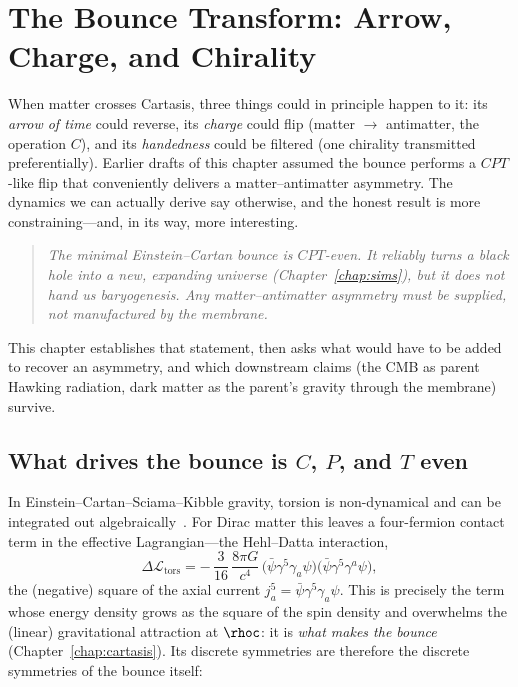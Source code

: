 \chapter{The Bounce Transform: Arrow, Charge, and Chirality}
\label{chap:chirality}

When matter crosses Cartasis, three things could in principle happen to it: its
\emph{arrow of time} could reverse, its \emph{charge} could flip (matter $\to$
antimatter, the operation $C$), and its \emph{handedness} could be filtered (one
chirality transmitted preferentially). Earlier drafts of this chapter assumed
the bounce performs a $CPT$-like flip that conveniently delivers a
matter--antimatter asymmetry. The dynamics we can actually derive say otherwise,
and the honest result is more constraining---and, in its way, more interesting.

\begin{quote}
\itshape
The minimal Einstein--Cartan bounce is $CPT$-even. It reliably turns a black hole
into a new, expanding universe (Chapter~\ref{chap:sims}), but it does \emph{not}
hand us baryogenesis. Any matter--antimatter asymmetry must be supplied, not
manufactured by the membrane.
\end{quote}

This chapter establishes that statement, then asks what would have to be added to
recover an asymmetry, and which downstream claims (the CMB as parent Hawking
radiation, dark matter as the parent's gravity through the membrane) survive.

\section{What drives the bounce is $C$, $P$, and $T$ even}

In Einstein--Cartan--Sciama--Kibble gravity, torsion is non-dynamical and can be
integrated out algebraically~\citep{hehl1976}. For Dirac matter this leaves a
four-fermion contact term in the effective Lagrangian---the Hehl--Datta
interaction,
\[
  \Delta\mathcal{L}_{\text{tors}}
    = -\,\frac{3}{16}\,\frac{8\pi G}{c^4}\,
      \big(\bar\psi\gamma^5\gamma_a\psi\big)\big(\bar\psi\gamma^5\gamma^a\psi\big),
\]
the (negative) square of the axial current $j^5_a = \bar\psi\gamma^5\gamma_a\psi$.
This is precisely the term whose energy density grows as the square of the spin
density and overwhelms the (linear) gravitational attraction at $\rhoc$: it is
\emph{what makes the bounce} (Chapter~\ref{chap:cartasis}). Its discrete
symmetries are therefore the discrete symmetries of the bounce itself:

